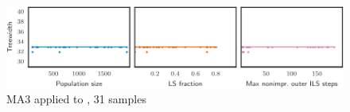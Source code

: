\begin{figure}[h]\strictpagecheck\centering

\includegraphics[scale=0.85]{plots/MA3-correlation-regplots-zeroin-i-3-0-crop.pdf}


\caption[Parameter influence for MA3 when applied to ]{\gls{MA3} applied to , 31 samples}

\label{MA3-correlation-regplots-zeroin-i-3}

\end{figure}